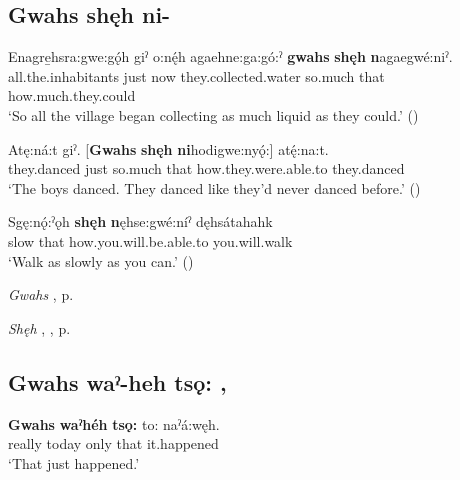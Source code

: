\subsection*{\textbf{Gwahs shęh ni-} } \label{p:[gwahs shęh ni-]}

\ea
\label{ex:gpar108}
\gll Enagre̱hsra:gwe:gǫ́h giˀ o:nę́h agaehne:ga:gó:ˀ \textbf{gwahs} \textbf{shęh} \textbf{n}agaegwé:niˀ.\\
all.the.inhabitants just now they.collected.water so.much that how.much.they.could\\
\glt ‘So all the village began collecting as much liquid as they could.’ (\cite{carrier_legends_2013})
\z

\ea
\label{ex:gpar109}
\gll Atę:ná:t giˀ. [\textbf{Gwahs} \textbf{shęh} \textbf{ni}hodigwe:nyǫ́:] atę́:na:t.\\
they.danced just so.much that how.they.were.able.to they.danced\\
\glt ‘The boys danced. They danced like they’d never danced before.’ (\cite{carrier_legends_2013})
\z

\ea
\label{ex:gpar110}
\gll Sgę:nǫ́:ˀǫh \textbf{shęh} \textbf{n}ęhse:gwé:níˀ dęhsátahahk\\
slow that how.you.will.be.able.to you.will.walk\\
\glt ‘Walk as slowly as you can.’ (\cite{mithun_how_1980})
\z

\begin{CayugaRelated}
\item \textit{Gwahs} , p. \pageref{p:[gwahs] ‘anyway’}\\
\item \textit{Shęh} , , p. \pageref{p:[shęh] `because’}
\end{CayugaRelated}


\subsection*{\textbf{Gwahs waˀ-heh tsǫ:} , } \label{p:[gwahs waˀ-heh tsǫ:]}

\ea
\label{ex:gpar111}
\gll \textbf{Gwahs} \textbf{waˀhéh} \textbf{tsǫ:} to: naˀá:węh.\\
really today only that it.happened\\
\glt ‘That just happened.’
\z


